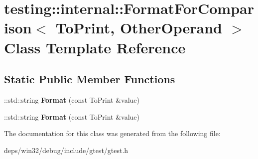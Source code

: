 \hypertarget{classtesting_1_1internal_1_1_format_for_comparison}{}\section{testing\+:\+:internal\+:\+:Format\+For\+Comparison$<$ To\+Print, Other\+Operand $>$ Class Template Reference}
\label{classtesting_1_1internal_1_1_format_for_comparison}
\subsection*{Static Public Member Functions}
\begin{DoxyCompactItemize}
\item 
\hypertarget{classtesting_1_1internal_1_1_format_for_comparison_a2aeb688fc55b57abd3021d82eccad896}{}\+::std\+::string {\bfseries Format} (const To\+Print \&value)\label{classtesting_1_1internal_1_1_format_for_comparison_a2aeb688fc55b57abd3021d82eccad896}

\item 
\hypertarget{classtesting_1_1internal_1_1_format_for_comparison_a2aeb688fc55b57abd3021d82eccad896}{}\+::std\+::string {\bfseries Format} (const To\+Print \&value)\label{classtesting_1_1internal_1_1_format_for_comparison_a2aeb688fc55b57abd3021d82eccad896}

\end{DoxyCompactItemize}


The documentation for this class was generated from the following file\+:\begin{DoxyCompactItemize}
\item 
deps/win32/debug/include/gtest/gtest.\+h\end{DoxyCompactItemize}

